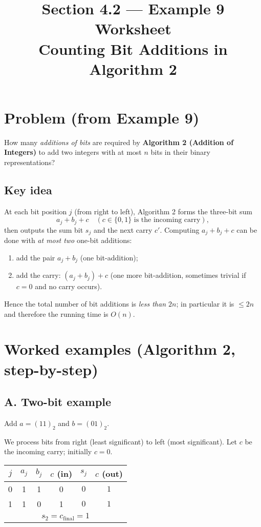 \documentclass[12pt]{article}
\title{Section 4.2 — Example 9 Worksheet\\
Counting Bit Additions in Algorithm 2}
\author{}
\date{}
\begin{document}
\maketitle

\section*{Problem (from Example 9)}
How many \emph{additions of bits} are required by \textbf{Algorithm 2 (Addition of Integers)} to add two integers with at most $n$ bits in their binary representations?

\subsection*{Key idea}
At each bit position $j$ (from right to left), Algorithm 2 forms the three-bit sum
\[
a_j + b_j + c \quad (c \in \{0,1\} \text{ is the incoming carry}),
\]
then outputs the sum bit $s_j$ and the next carry $c'$. Computing $a_j+b_j+c$ can be done with \emph{at most two} one-bit additions:
\begin{enumerate}
  \item add the pair $a_j+b_j$ (one bit-addition);
  \item add the carry: $(a_j+b_j)+c$ (one more bit-addition, sometimes trivial if $c=0$ and no carry occurs).
\end{enumerate}
Hence the total number of bit additions is \emph{less than $2n$}; in particular it is $\le 2n$ and therefore the running time is $O(n)$.

\section*{Worked examples (Algorithm 2, step-by-step)}

\subsection*{A. Two-bit example}
Add $a=(11)_2$ and $b=(01)_2$.

We process bits from right (least significant) to left (most significant). Let $c$ be the incoming carry; initially $c=0$.

\medskip
\begin{center}
\begin{tabular}{c|c c c|c c}
$j$ & $a_j$ & $b_j$ & $c$ (in) & $s_j$ & $c$ (out)\\\hline
0 & 1 & 1 & 0 & $0$ & $1$\\
1 & 1 & 0 & 1 & $0$ & $1$\\\hline
\multicolumn{6}{c}{$s_2=c_{\text{final}}=1$}
\end{tabular}
\end{center}
\end{document}
